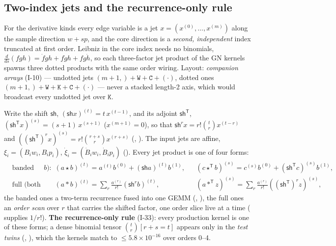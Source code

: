 \documentclass[11pt]{article}
\newcommand{\Sh}{\mathsf{sh}}
\newcommand{\T}{\mathsf{T}}
\theoremstyle{definition}
\theoremstyle{plain}
\begin{document}
\subsection{Two-index jets and the recurrence-only rule}
\label{sec:jets}

For the derivative kinds every edge variable is a jet $x=(x^{(0)},\dots,x^{(m)})$ along the sample direction
$w+sp$, and the core direction is a \emph{second, independent} index truncated at first order. Leibniz in the core
index needs no binomials, $\frac{d}{ds}(fgh)=\dot fgh+f\dot gh+fg\dot h$, so each three-factor jet product of the GN
kernels spawns three dotted products with the same order wiring. Layout: \emph{companion arrays} (I-10) ---
undotted jets $(m{+}1,)+\mathtt{W+C}+(\cdot)$, dotted ones $(m{+}1,)+\mathtt{W+K+C}+(\cdot)$ --- never a stacked
length-2 axis, which would broadcast every undotted jet over $\mathtt K$.

Write the shift $\Sh$, $(\Sh x)^{(t)}=t\,x^{(t-1)}$, and its adjoint $\Sh^\T$, $(\Sh^\T x)^{(s)}=(s+1)\,x^{(s+1)}$
($x^{(m+1)}=0$), so that $\Sh^r x=r!\binom{t}{r}x^{(t-r)}$ and $((\Sh^\T)^rx)^{(s)}=r!\binom{r+s}{r}x^{(r+s)}$
(, ). The input jets are affine, $\xi_i=(B_iw_i,B_ip_i)$,
$\dot\xi_i=(\dot B_iw_i,\dot B_ip_i)$ (). Every jet product is one of four forms:
\begin{align}
  \label{eq:band}
  &\text{banded (one affine factor } b\text{):} && (a\star b)^{(t)}=a^{(t)}b^{(0)}+(\Sh a)^{(t)}b^{(1)},
     && (c\star^\T b)^{(s)}=c^{(s)}b^{(0)}+(\Sh^\T c)^{(s)}b^{(1)},\\
  \label{eq:conv}
  &\text{full (both jets):} && (a\ast b)^{(t)}=\textstyle\sum_r\frac{a^{(r)}}{r!}(\Sh^r b)^{(t)},
     && (a\ast^\T z)^{(s)}=\textstyle\sum_r\frac{a^{(r)}}{r!}((\Sh^\T)^r z)^{(s)},
\end{align}
the banded ones a two-term recurrence fused into one GEMM (, ), the
full ones an \emph{order scan} over $r$ that carries the shifted factor, one order slice live at a time
( supplies $1/r!$). \textbf{The recurrence-only rule} (I-33): every production kernel is one
of these forms; a dense binomial tensor $\binom{t}{r}[r+s=t]$ appears only in the  \emph{test twins}
(, ), which the kernels match to
$\le5.8\times10^{-16}$ over orders 0--4.
\end{document}
